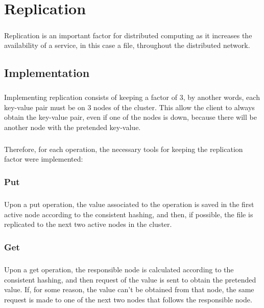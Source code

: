 \documentclass{report}
\begin{document}
	\chapter{Replication}
	
	        \paragraph{} Replication is an important factor for distributed computing
			as it increases the availability of a service, in this case a file,
			throughout the distributed network.
	        
			\section{Implementation}
	
				\paragraph{} Implementing replication consists of keeping a factor 
				of 3, by another words, each key-value pair must be on 3 nodes of 
				the cluster. This allow the client to always obtain the key-value 
				pair, even if one of the nodes is down, because there will be another
				node with the pretended key-value. 

				\paragraph{} Therefore, for each operation, the necessary tools for 
				keeping the replication factor were implemented:
				
				\subsection{Put}
					\paragraph{} Upon a put operation, the value associated to the
					operation is saved in the first active node according to the 
					consistent hashing, and then, if possible, the file is replicated to 
					the next two active nodes in the cluster.

				\subsection{Get}
					\paragraph{} Upon a get operation, the responsible node is calculated
					according to the consistent hashing, and then request of the value
					is sent to obtain the pretended value. If, for some reason, the 
					value can't be obtained from that node, the same request 
					is made to one of the next two nodes that follows the responsible 
					node.
\end{document}
